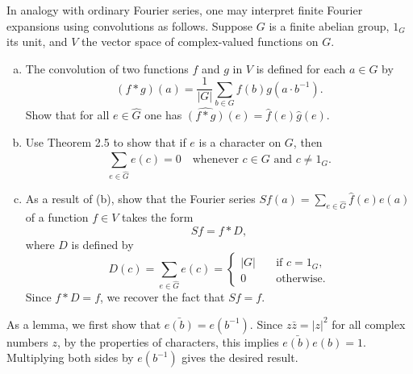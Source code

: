 \begin{exrc}[13]
    In analogy with ordinary Fourier series,
    one may interpret finite Fourier expansions using convolutions as follows.
    Suppose \(G\) is a finite abelian group,
    \(1_G\) its unit,
    and \(V\) the vector space of complex-valued functions on \(G\).
    \begin{enumerate}[(a)]
    \item
        The convolution of two functions \(f\) and \(g\) in \(V\) is defined for each \(a \in G\) by
        \begin{equation*}
            (f * g)(a) = \frac{1}{|G|} \sum_{b \in G}^{} f(b) g(a \cdot b^{-1}).
        \end{equation*}
        Show that for all \(e \in \hat{G}\) one has \(\hat{(f * g)}(e) = \hat{f}(e) \hat{g}(e)\).

    \item
        Use Theorem 2.5 to show that if \(e\) is a character on \(G\), then
        \begin{equation*}
            \sum_{e \in \hat{G}}^{} e(c) = 0 \quad
            \text{whenever \(c \in G\) and \(c \neq 1_G\).}
        \end{equation*}

    \item
        As a result of (b),
        show that the Fourier series \(Sf(a) = \sum_{e \in \hat{G}}^{} \hat{f}(e) e(a)\)
        of a function \(f \in V\) takes the form
        \begin{equation*}
            S f = f * D,
        \end{equation*}
        where \(D\) is defined by
        \begin{equation*}
            D(c) = \sum_{e \in \hat{G}}^{} e(c)
            =
            \begin{cases}
                |G| \quad &\text{if \(c = 1_G\)},\\
                0 \quad &\text{otherwise}.
            \end{cases}
        \end{equation*}
        Since \(f * D = f\), we recover the fact that \(Sf = f\).
    \end{enumerate}

\begin{soln}
        As a lemma,
        we first show that \(\bar{e(b)} = e(b^{-1})\).
        Since \(z \bar{z} = |z|^2\) for all complex numbers \(z\),
        by the properties of characters,
        this implies \(\bar{e(b)}e(b) = 1\).
        Multiplying both sides by \(e(b^{-1})\) gives the desired result.


\end{soln}
\end{exrc}
